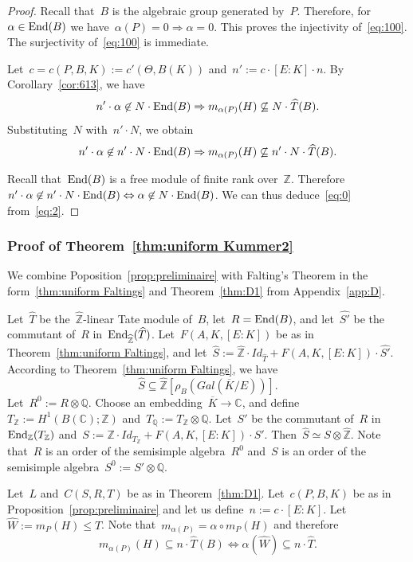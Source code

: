 \documentclass[12pt]{amsart}
\newcommand{\End}{{\rm End}}
\newcommand{\Z}{{\mathbb Z}}
\newcommand{\Q}{{\mathbb Q}}
\newcommand{\C}{{\mathbb C}}
\newcommand{\ol}{\overline}
\newcommand{\wh}{\widehat}
\newcommand{\tens}{\otimes}
\begin{document}
\begin{proof}Recall that~$B$ is the algebraic group generated by~$P$. Therefore, for~$\alpha\in \End(B)$ we have~$\alpha(P)=0\Rightarrow \alpha=0$. This proves the injectivity of~\eqref{eq:100}. The surjectivity of~\eqref{eq:100} is immediate.

Let~$c=c(P,B,K):=c'(\Theta,B(K))$ and~$n':=c\cdot [E:K]\cdot n$.
By Corollary~\ref{cor:613}, we have
\begin{equation}\label{eq:1}
n'\cdot \alpha\not\in N\cdot \End(B)\Rightarrow m_{\alpha(P)}(H)\not\subseteq N\cdot \wh{T}(B).
\end{equation}
Substituting~$N$ with~$n'\cdot N$, we obtain
\begin{equation}\label{eq:2}
n'\cdot \alpha\not\in n'\cdot N\cdot \End(B)\Rightarrow m_{\alpha(P)}(H)\not\subseteq n'\cdot N\cdot \wh{T}(B).
\end{equation}


Recall that~$\End(B)$ is a free module of finite rank over~$\Z$. Therefore~$n'\cdot \alpha\not\in n'\cdot N\cdot \End(B)\Leftrightarrow \alpha\not\in N\cdot \End(B)$. We can thus deduce~\eqref{eq:0} from~\eqref{eq:2}.
\end{proof}
\subsubsection{Proof of Theorem~\ref{thm:uniform Kummer2}}\label{sec:proof 4.10}
 We combine Poposition~\ref{prop:preliminaire} with Falting's Theorem in the form~\ref{thm:uniform Faltings} and Theorem~\ref{thm:D1} from Appendix~\ref{app:D}.

Let~$\wh{T}$ be the~$\wh{\Z}$-linear Tate module of~$B$, let~$R=\End(B)$, and let~$\wh{S'}$ be the commutant
of~$R$ in~$\End_{\wh{\Z}}(\wh{T})$. Let~$F(A,K,[E:K])$ be as in Theorem~\ref{thm:uniform Faltings}, and let~$\wh{S}:=\wh{\Z}\cdot Id_{\wh{T}}+F(A,K,[E:K])\cdot \wh{S'}$. According to Theorem~\ref{thm:uniform Faltings},
we have
\[
\wh{S}\subseteq \wh{\Z}\left[\rho_{B}(Gal(\ol{K}/E))\right].
\]
Let~$R^0:=R\tens \Q$. Choose an embedding~$\ol{K}\to \C$, and define~$T_\Z:=H^1(B(\C);\Z)$ and~$T_\Q:=T_\Z\tens\Q$.
Let~$S'$ be the commutant of~$R$ in~$\End_\Z(T_\Z)$ and~$S:=\Z\cdot Id_{T_\Z}+F(A,K,[E:K])\cdot S'$. Then~$\wh{S}\simeq S\tens \wh{\Z}$. Note that~$R$ is an order of the semisimple algebra~$R^0$ and~$S$ is an order of the semisimple algebra~$S^0:=S'\tens\Q$. 

Let~$L$ and~$C(S,R,T)$ be as in Theorem~\ref{thm:D1}. Let~$c(P,B,K)$ be as in Proposition~\ref{prop:preliminaire} and let us define~$n:=c\cdot [E:K]$. Let~$\wh{W}:=m_{P}(H) \leq \wh{T}$. Note that~$m_{\alpha(P)}=\alpha\circ m_{P}(H)$ and therefore
\[
m_{\alpha(P)}(H)\subseteq n \cdot \wh{T}(B)\Leftrightarrow
\alpha(\wh{W})\subseteq n\cdot \wh{T}.
\]
\end{document}
